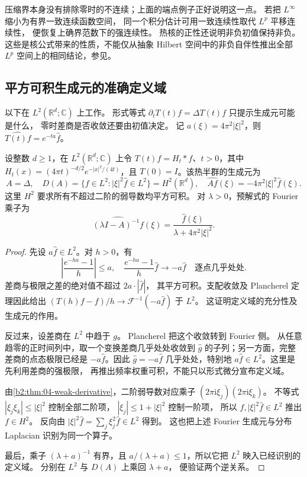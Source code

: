 压缩界本身没有排除零时的不连续；上面的端点例子正好说明这一点。
若把 \(L^\infty\) 缩小为有界一致连续函数空间，
同一个积分估计可用一致连续性取代 \(L^p\) 平移连续性，
便恢复上确界范数下的强连续性。
热核的正性还说明非负初值保持非负。
这些是核公式带来的性质，不能仅从抽象 Hilbert 空间中的非负自伴性推出全部
\(L^p\) 空间上的相同结论，参见。

\subsection{平方可积生成元的准确定义域}
\label{b2:subsec:D-heat-domain}

以下在 \(L^2(\mathbb R^d;\mathbb C)\) 上工作。
形式等式 \(\partial_tT(t)f=\Delta T(t)f\) 只提示生成元可能是什么，
零时差商是否收敛还要由初值决定。
记 \(a(\xi)=4\pi^2|\xi|^2\)，则
\(\widehat{T(t)f}=e^{-ta}\widehat f\)。

\begin{theorem}[热生成元及其定义域]\label{b2:thm:D-heat-generator}
设整数 \(d\ge1\)，在 \(L^2(\mathbb R^d;\mathbb C)\) 上令 \(T(t)f=H_t*f\)、\(t>0\)，其中 \(H_t(x)=(4\pi t)^{-d/2}e^{-|x|^2/(4t)}\)，且 \(T(0)=I\)。该热半群的生成元为
\[
 A=\Delta,
 \quad D(A)=\{f\in L^2:|\xi|^2\widehat f\in L^2\}
           =H^2(\mathbb R^d),
 \quad \widehat{Af}(\xi)=-4\pi^2|\xi|^2\widehat f(\xi).
\]
这里 \(H^2\) 要求所有不超过二阶的弱导数均平方可积。
对 \(\lambda>0\)，预解式的 Fourier 乘子为
\[
 \widehat{(\lambda I-A)^{-1}f}(\xi)
 =\frac{\widehat f(\xi)}{\lambda+4\pi^2|\xi|^2}.
\]
\end{theorem}
\begin{proof}
先设 \(a\widehat f\in L^2\)。对 \(h>0\)，有
\[
 \left|\frac{e^{-ha}-1}{h}\right|\le a,
 \quad \frac{e^{-ha}-1}{h}\widehat f\longrightarrow-a\widehat f
 \quad\text{逐点几乎处处}.
\]
差商与极限之差的绝对值不超过 \(2a\cdot|\widehat f|\)，
其平方可积。支配收敛及 Plancherel 定理因此给出
\((T(h)f-f)/h\to\mathcal F^{-1}(-a\widehat f)\) 于 \(L^2\)。
这证明定义域的充分性及生成元的作用。

反过来，设差商在 \(L^2\) 中趋于 \(g\)。
Plancherel 把这个收敛转到 Fourier 侧。
从任意趋零的正时间列中，取一个变换差商几乎处处收敛到
\(\widehat g\) 的子列；另一方面，完整差商的点态极限已经是
\(-a\widehat f\)。因此
\(\widehat g=-a\widehat f\) 几乎处处，特别地
\(a\widehat f\in L^2\)。这里是先利用差商的强极限，
再推出频率权重可积，不能只以形式微分宣布定义域。

由\cref{b2:thm:04-weak-derivative}，二阶弱导数对应乘子
\((2\pi\mathrm i\xi_j)(2\pi\mathrm i\xi_k)\)。
不等式 \(|\xi_j\xi_k|\le|\xi|^2\) 控制全部二阶项，
\(|\xi_j|\le1+|\xi|^2\) 控制一阶项，
所以 \(f,|\xi|^2\widehat f\in L^2\) 推出 \(f\in H^2\)。
反向由 \(|\xi|^2\widehat f=\sum_j\xi_j^2\widehat f\in L^2\) 得到。
这也把上述 Fourier 生成元与分布 Laplacian 识别为同一个算子。

最后，乘子 \((\lambda+a)^{-1}\) 有界，且
\(a/(\lambda+a)\le1\)，所以它把 \(L^2\) 映入已经识别的定义域。
分别在 \(L^2\) 与 \(D(A)\) 上乘回 \(\lambda+a\)，
便验证两个逆关系。
\end{proof}

